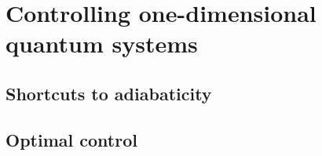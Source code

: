 
\chapter{Controlling one-dimensional quantum systems} \label{ch-1d}

\section{Shortcuts to adiabaticity}
\section{Optimal control}
